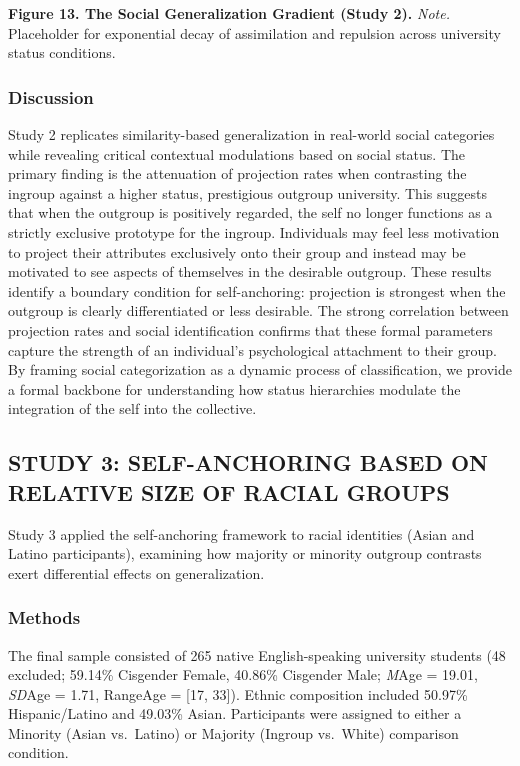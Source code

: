 \documentclass[
  man,
  longtable,
  nolmodern,
  notxfonts,
  notimes,
  man]{apa7}
\begin{document}
\textbf{Figure 13. The Social Generalization Gradient (Study 2).}
\emph{Note.} Placeholder for exponential decay of assimilation and
repulsion across university status conditions.

\subsubsection{Discussion}\label{discussion-1}

Study 2 replicates similarity-based generalization in real-world social
categories while revealing critical contextual modulations based on
social status. The primary finding is the attenuation of projection
rates when contrasting the ingroup against a higher status, prestigious
outgroup university. This suggests that when the outgroup is positively
regarded, the self no longer functions as a strictly exclusive prototype
for the ingroup. Individuals may feel less motivation to project their
attributes exclusively onto their group and instead may be motivated to
see aspects of themselves in the desirable outgroup. These results
identify a boundary condition for self-anchoring: projection is
strongest when the outgroup is clearly differentiated or less desirable.
The strong correlation between projection rates and social
identification confirms that these formal parameters capture the
strength of an individual's psychological attachment to their group. By
framing social categorization as a dynamic process of classification, we
provide a formal backbone for understanding how status hierarchies
modulate the integration of the self into the collective.

\subsection{STUDY 3: SELF-ANCHORING BASED ON RELATIVE SIZE OF RACIAL
GROUPS}\label{study-3-self-anchoring-based-on-relative-size-of-racial-groups}

Study 3 applied the self-anchoring framework to racial identities (Asian
and Latino participants), examining how majority or minority outgroup
contrasts exert differential effects on generalization.

\subsubsection{Methods}\label{methods-2}

The final sample consisted of 265 native English-speaking university
students (48 excluded; 59.14\% Cisgender Female, 40.86\% Cisgender Male;
\emph{M}Age = 19.01, \emph{SD}Age = 1.71, RangeAge = {[}17, 33{]}).
Ethnic composition included 50.97\% Hispanic/Latino and 49.03\% Asian.
Participants were assigned to either a Minority (Asian vs.~Latino) or
Majority (Ingroup vs.~White) comparison condition.
\end{document}

